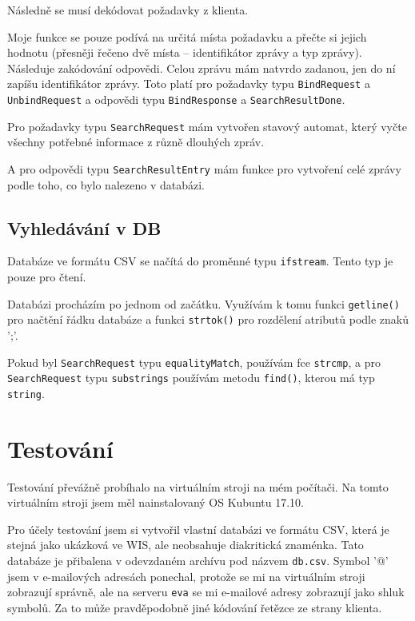 \documentclass[a4paper, 11pt]{article}
\begin{document}
Následně se musí dekódovat požadavky z klienta. 

Moje funkce se pouze podívá na určitá místa požadavku a přečte si jejich hodnotu (přesněji řečeno dvě místa -- identifikátor zprávy a typ zprávy).
Následuje zakódování odpovědi. Celou zprávu mám natvrdo zadanou, jen do ní zapíšu identifikátor zprávy.
Toto platí pro požadavky typu \texttt{BindRequest} a \texttt{UnbindRequest} a odpovědi typu \texttt{BindResponse} a \texttt{SearchResultDone}.

Pro požadavky typu \texttt{SearchRequest} mám vytvořen stavový automat, který vyčte všechny potřebné informace z různě dlouhých zpráv.

A pro odpovědi typu \texttt{SearchResultEntry} mám funkce pro vytvoření celé zprávy podle toho, co bylo nalezeno v databázi.

\subsection{Vyhledávání v DB}

Databáze ve formátu CSV se načítá do proměnné typu \texttt{ifstream}. Tento typ je pouze pro čtení.

Databázi procházím po jednom od začátku. Využívám k tomu funkci \texttt{getline()} pro načtění řádku databáze a funkci \texttt{strtok()} pro rozdělení atributů podle znaků ';'.

Pokud byl \texttt{SearchRequest} typu \texttt{equalityMatch}, používám fce \texttt{strcmp}, a pro \texttt{SearchRequest} typu \texttt{substrings} používám metodu \texttt{find()}, kterou má typ \texttt{string}.


\pagebreak


\section{Testování}

Testování převážně probíhalo na virtuálním stroji na mém počítači. Na tomto virtuálním stroji jsem měl nainstalovaný OS Kubuntu 17.10.

Pro účely testování jsem si vytvořil vlastní databázi ve formátu CSV, která je stejná jako ukázková ve WIS, ale neobsahuje diakritická znaménka. Tato databáze je přibalena v odevzdaném archívu pod názvem \texttt{db.csv}. Symbol '@' jsem v e-mailových adresách ponechal, protože se mi na virtuálním stroji zobrazují správně, ale na serveru \texttt{eva} se mi e-mailové adresy zobrazují jako shluk symbolů. Za to může pravděpodobně jiné kódování řetězce ze strany klienta.
\bigskip
\end{document}
